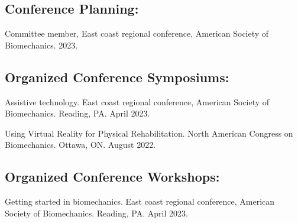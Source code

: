 \documentclass[letterpaper, 10pt]{article}
\begin{document}
\subsection{Conference Planning:}
\begin{compactenum} %
     \item Committee member, East coast regional conference, American Society of Biomechanics. 2023.
\end{compactenum} %

\subsection{Organized Conference Symposiums:}
\begin{compactenum} %
     \item Assistive technology. East coast regional conference, American Society of Biomechanics. Reading, PA. April 2023.
     \item Using Virtual Reality for Physical Rehabilitation. North American Congress on Biomechanics. Ottawa, ON. August 2022.
\end{compactenum} %

\subsection{Organized Conference Workshops:}
\begin{compactenum} %
     \item Getting started in biomechanics. East coast regional conference, American Society of Biomechanics. Reading, PA. April 2023.
\end{compactenum} %
\end{document}
